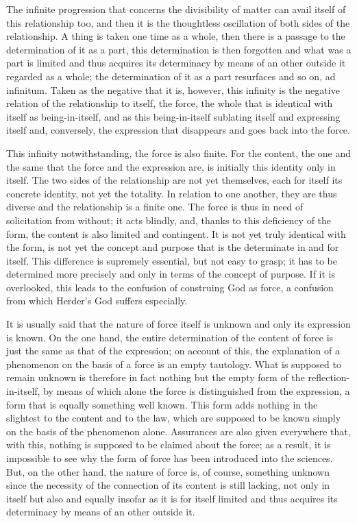 The infinite progression that concerns
the divisibility of matter
can avail itself of this relationship too,
and then it is the thoughtless oscillation
of both sides of the relationship.
A thing is taken one time as a whole,
then there is a passage to the determination of it as a part,
this determination is then forgotten
and what was a part is limited and thus acquires
its determinacy by means of an other outside it
regarded as a whole;
the determination of it as a part resurfaces
and so on, ad infinitum.
Taken as the negative that it is, however,
this infinity is the negative relation of
the relationship to itself, the force,
the whole that is identical with itself as being-in-itself,
and as this being-in-itself sublating itself and expressing itself
and, conversely, the expression that disappears
and goes back into the force.

This infinity notwithstanding,
the force is also finite.
For the content, the one and the same
that the force and the expression are, is
initially this identity only in itself.
The two sides of the relationship
are not yet themselves,
each for itself its concrete identity,
not yet the totality.
In relation to one another, they are thus diverse
and the relationship is a finite one.
The force is thus in need of solicitation from without;
it acts blindly, and, thanks to this deficiency of the form,
the content is also limited and contingent.
It is not yet truly identical with the form,
is not yet the concept and purpose
that is the determinate in and for itself.
This difference is supremely essential,
but not easy to grasp;
it has to be determined more precisely and
only in terms of the concept of purpose.
If it is overlooked, this leads to
the confusion of construing God as force,
a confusion from which Herder's God suffers especially.

It is usually said that the nature of force itself is unknown
and only its expression is known.
On the one hand, the entire determination of the content of force is
just the same as that of the expression;
on account of this, the explanation of a phenomenon
on the basis of a force is an empty tautology.
What is supposed to
remain unknown is therefore in fact nothing but the empty form
of the reflection-in-itself, by means of which alone the force is
distinguished from the expression, a form that is equally
something well known.
This form adds nothing in the slightest to the content and to the law,
which are supposed to be known simply on the basis of the phenomenon alone.
Assurances are also given everywhere that, with this, nothing is
supposed to be claimed about the force; as a result, it is impossible to
see why the form of force has been introduced into the sciences.
But, on the other hand, the nature of force is, of course, something
unknown since the necessity of the connection of its content is still
lacking, not only in itself but also and equally insofar as it is for itself
limited and thus acquires its determinacy by means of an other outside it.

